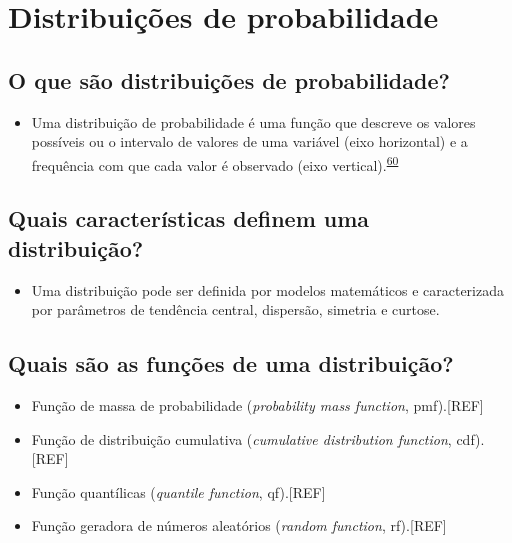 \documentclass[
  a4paper,
]{book}
\providecommand{\tightlist}{%
  \setlength{\itemsep}{0pt}\setlength{\parskip}{0pt}}
\begin{document}
\hypertarget{distribuicoes}{%
\section{Distribuições de probabilidade}\label{distribuicoes}}

\hypertarget{o-que-suxe3o-distribuiuxe7uxf5es-de-probabilidade}{%
\subsection{O que são distribuições de probabilidade?}\label{o-que-suxe3o-distribuiuxe7uxf5es-de-probabilidade}}

\begin{itemize}
\tightlist
\item
  Uma distribuição de probabilidade é uma função que descreve os valores possíveis ou o intervalo de valores de uma variável (eixo horizontal) e a frequência com que cada valor é observado (eixo vertical).\textsuperscript{\protect\hyperlink{ref-vetter2017}{60}}
\end{itemize}

\hypertarget{quais-caracteruxedsticas-definem-uma-distribuiuxe7uxe3o}{%
\subsection{Quais características definem uma distribuição?}\label{quais-caracteruxedsticas-definem-uma-distribuiuxe7uxe3o}}

\begin{itemize}
\tightlist
\item
  Uma distribuição pode ser definida por modelos matemáticos e caracterizada por parâmetros de tendência central, dispersão, simetria e curtose.
\end{itemize}

\hypertarget{quais-suxe3o-as-funuxe7uxf5es-de-uma-distribuiuxe7uxe3o}{%
\subsection{Quais são as funções de uma distribuição?}\label{quais-suxe3o-as-funuxe7uxf5es-de-uma-distribuiuxe7uxe3o}}

\begin{itemize}
\item
  Função de massa de probabilidade (\emph{probability mass function}, pmf).{[}REF{]}
\item
  Função de distribuição cumulativa (\emph{cumulative distribution function}, cdf).{[}REF{]}
\item
  Função quantílicas (\emph{quantile function}, qf).{[}REF{]}
\item
  Função geradora de números aleatórios (\emph{random function}, rf).{[}REF{]}
\end{itemize}
\end{document}
